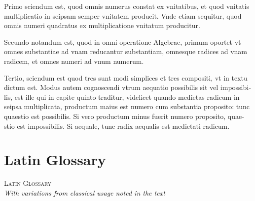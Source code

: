 \documentclass[11pt,a4paper]{book}
\begin{document}
\textlatin{Primo sciendum est, quod omnis numerus constat ex vnitatibus, et quod vnitatis multiplicatio in seipsam semper vnitatem producit. Vnde etiam sequitur, quod omnis numeri quadratus ex multiplicatione vnitatum producitur.}

\textlatin{Secundo notandum est, quod in omni operatione Algebrae, primum oportet vt omnes substantiae ad vnam reducantur substantiam, omnesque radices ad vnam radicem, et omnes numeri ad vnum numerum.}

\textlatin{Tertio, sciendum est quod tres sunt modi simplices et tres compositi, vt in textu dictum est. Modus autem cognoscendi vtrum aequatio possibilis sit vel impossibilis, est ille qui in capite quinto traditur, videlicet quando medietas radicum in seipsa multiplicata, productum maius est numero cum substantia proposito: tunc quaestio est possibilis. Si vero productum minus fuerit numero proposito, quaestio est impossibilis. Si aequale, tunc radix aequalis est medietati radicum.}

\vspace{1cm}

\part*{Latin Glossary}

\begin{center}
\textsc{Latin Glossary}\\
\textit{With variations from classical usage noted in the text}
\end{center}
\end{document}

